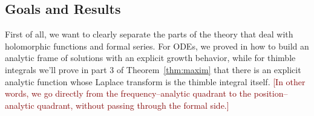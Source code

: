 \documentclass{article}
\newcommand{\laplace}{\mathcal{L}}
\newcommand{\borel}{\mathcal{B}}
\theoremstyle{definition}
\theoremstyle{plain}
\begin{document}



\subsection{Goals and Results}

First of all, we want to clearly separate the parts of the theory that deal with holomorphic functions and formal series. For ODEs, we proved in \cite[Theorem~4]{reg-sing-volterra} how to build an analytic frame of solutions with an explicit growth behavior, while for thimble integrals we'll prove in part 3 of Theorem~\ref{thm:maxim} that there is an explicit analytic function whose Laplace transform is the thimble integral itself. \textcolor{Maroon}{[In other words, we go directly from the frequency--analytic quadrant to the position--analytic quadrant, without passing through the formal side.]}
\end{document}
